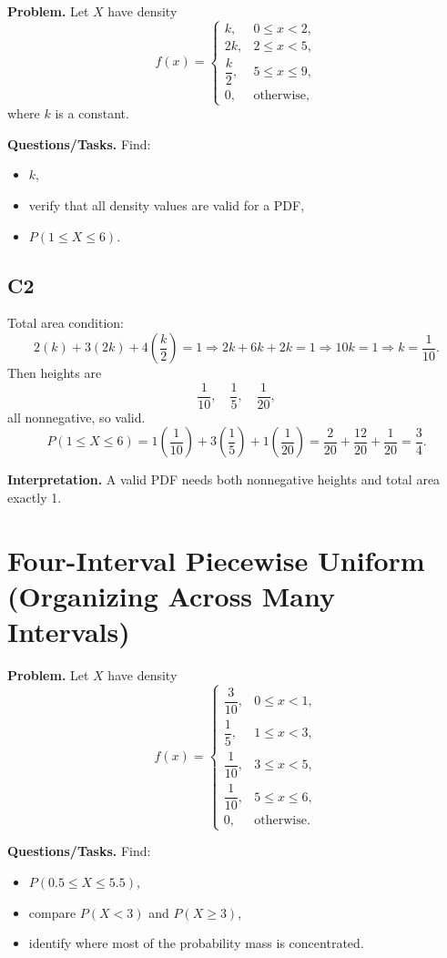 \textbf{Problem.}
Let $X$ have density
\[
f(x)=
\begin{cases}
k, & 0\le x<2,\\
2k, & 2\le x<5,\\
\dfrac{k}{2}, & 5\le x\le 9,\\
0, & \text{otherwise,}
\end{cases}
\]
where $k$ is a constant.

\textbf{Questions/Tasks.}
Find:
\begin{itemize}
    \item[(a)] $k$,
    \item[(b)] verify that all density values are valid for a PDF,
    \item[(c)] $P(1\le X\le 6)$.
\end{itemize}

\subsection*{C2}
Total area condition:
\[
2(k)+3(2k)+4\left(\frac{k}{2}\right)=1
\Rightarrow 2k+6k+2k=1
\Rightarrow 10k=1
\Rightarrow k=\frac{1}{10}.
\]
Then heights are
\[
\frac{1}{10},\quad \frac{1}{5},\quad \frac{1}{20},
\]
all nonnegative, so valid.
\[
P(1\le X\le 6)=1\left(\frac{1}{10}\right)+3\left(\frac{1}{5}\right)+1\left(\frac{1}{20}\right)
=\frac{2}{20}+\frac{12}{20}+\frac{1}{20}=\frac{3}{4}.
\]

\textbf{Interpretation.}
A valid PDF needs both nonnegative heights and total area exactly 1.

\section{Four-Interval Piecewise Uniform (Organizing Across Many Intervals)}

\textbf{Problem.}
Let $X$ have density
\[
f(x)=
\begin{cases}
\dfrac{3}{10}, & 0\le x<1,\\
\dfrac{1}{5}, & 1\le x<3,\\
\dfrac{1}{10}, & 3\le x<5,\\
\dfrac{1}{10}, & 5\le x\le 6,\\
0, & \text{otherwise.}
\end{cases}
\]

\textbf{Questions/Tasks.}
Find:
\begin{itemize}
    \item[(a)] $P(0.5\le X\le 5.5)$,
    \item[(b)] compare $P(X<3)$ and $P(X\ge 3)$,
    \item[(c)] identify where most of the probability mass is concentrated.
\end{itemize}

